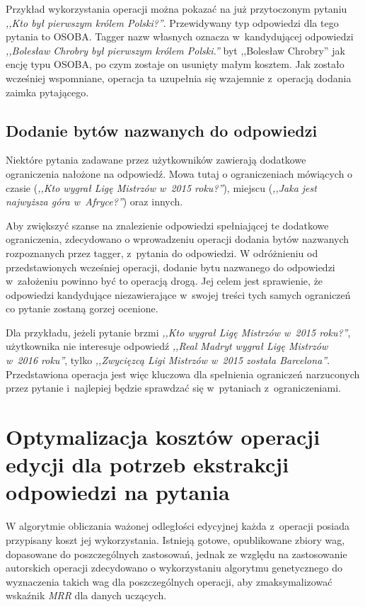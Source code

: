 \documentclass[a4paper, twoside, 12pt]{report}
\begin{document}
            Przykład wykorzystania operacji można pokazać na już przytoczonym pytaniu \emph{,,Kto był pierwszym królem Polski?''}.
            Przewidywany typ odpowiedzi dla tego pytania to OSOBA. Tagger nazw własnych oznacza w~kandydującej odpowiedzi
            \emph{,,Bolesław Chrobry był pierwszym królem Polski.''} byt ,,Bolesław Chrobry'' jak encję typu OSOBA,
            po czym zostaje on usunięty małym kosztem. Jak zostało wcześniej wspomniane, operacja ta uzupełnia się wzajemnie
            z~operacją dodania zaimka pytającego.

        \subsection{Dodanie bytów nazwanych do odpowiedzi}
            Niektóre pytania zadawane przez użytkowników zawierają dodatkowe ograniczenia nałożone na odpowiedź. Mowa tutaj
            o ograniczeniach mówiących o czasie (\emph{,,Kto wygrał Ligę Mistrzów w~2015 roku?''}), miejscu
            (\emph{,,Jaka jest najwyższa góra w~Afryce?''}) oraz innych.

            Aby zwiększyć szanse na znalezienie odpowiedzi spełniającej te dodatkowe ograniczenia, zdecydowano o wprowadzeniu
            operacji dodania bytów nazwanych rozpoznanych przez tagger, z~pytania do odpowiedzi. W odróżnieniu od przedstawionych
            wcześniej operacji, dodanie bytu nazwanego do odpowiedzi w~założeniu powinno być to operacją drogą.
            Jej celem jest sprawienie, że odpowiedzi kandydujące niezawierające w~swojej treści tych samych ograniczeń
            co pytanie zostaną gorzej ocenione.

            Dla przykładu, jeżeli pytanie brzmi \emph{,,Kto wygrał Ligę Mistrzów w~2015 roku?''}, użytkownika nie interesuje
            odpowiedź \emph{,,Real Madryt wygrał Ligę Mistrzów w~2016 roku''}, tylko
            \emph{,,Zwycięzcą Ligi Mistrzów w~2015 została Barcelona''}. Przedstawiona operacja jest więc kluczowa dla
            spełnienia ograniczeń narzuconych przez pytanie i~najlepiej będzie sprawdzać się w~pytaniach z~ograniczeniami.

    \section{Optymalizacja kosztów operacji edycji dla potrzeb ekstrakcji odpowiedzi na pytania}
        W algorytmie obliczania ważonej odległości edycyjnej każda z~operacji posiada przypisany koszt jej wykorzystania.
        Istnieją gotowe, opublikowane zbiory wag, dopasowane do poszczególnych zastosowań, jednak ze względu na zastosowanie
        autorskich operacji zdecydowano o wykorzystaniu algorytmu genetycznego do wyznaczenia takich wag dla poszczególnych
        operacji, aby zmaksymalizować wskaźnik \emph{MRR} dla danych uczących.
\end{document}
